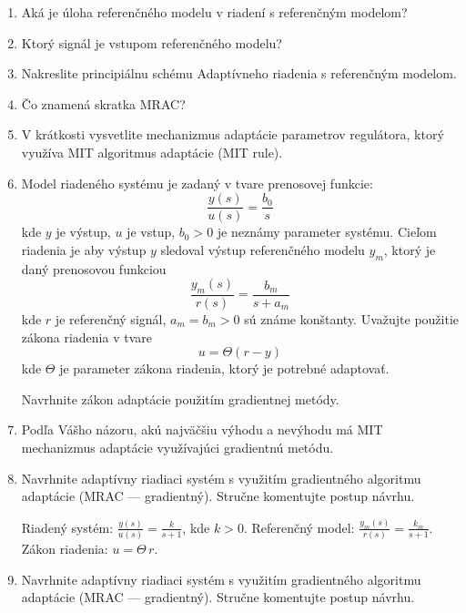 \documentclass[a4paper, 10pt, ]{article}
\begin{document}
\begin{enumerate}

	\item Aká je úloha referenčného modelu v riadení s referenčným modelom?
	\item Ktorý signál je vstupom referenčného modelu?
	\item Nakreslite principiálnu schému Adaptívneho riadenia s referenčným modelom.
	\item Čo znamená skratka MRAC?

	\item V krátkosti vysvetlite mechanizmus adaptácie parametrov regulátora, ktorý využíva MIT algoritmus adaptácie (MIT rule).

	\item Model riadeného systému je zadaný v tvare prenosovej funkcie:
	\begin{equation*}
		\frac{y(s)}{u(s)} = \frac{b_0}{s}
	\end{equation*}
	kde $y$ je výstup, $u$ je vstup, $b_0 > 0$ je neznámy parameter systému. Cieľom riadenia je aby výstup $y$ sledoval výstup referenčného modelu $y_m$, ktorý je daný prenosovou funkciou
	\begin{equation*}
			\frac{y_m(s)}{r(s)} = \frac{b_m}{s + a_m}
	\end{equation*}
	kde $r$ je referenčný signál, $a_m = b_m > 0$ sú známe konštanty. Uvažujte použitie zákona riadenia v tvare
	\begin{equation*}
		u = \Theta (r - y)
	\end{equation*}
	kde $\Theta$ je parameter zákona riadenia, ktorý je potrebné adaptovať.

	Navrhnite zákon adaptácie použitím gradientnej metódy.

	\item Podľa Vášho názoru, akú najväčšiu výhodu a nevýhodu má MIT mechanizmus adaptácie využívajúci gradientnú metódu.


	\item Navrhnite adaptívny riadiaci systém s využitím gradientného algoritmu adaptácie (MRAC --- gradientný). Stručne komentujte postup návrhu.

	Riadený systém: $\displaystyle \frac{y(s)}{u(s)} = \frac{k}{s + 1}$, kde $k>0$. Referenčný model: $\displaystyle \frac{y_m(s)}{r(s)} = \frac{k_m}{s + 1}$. Zákon riadenia: $u = \Theta\,r$.


	\item Navrhnite adaptívny riadiaci systém s využitím gradientného algoritmu adaptácie (MRAC --- gradientný). Stručne komentujte postup návrhu.


\end{enumerate}
\end{document}
